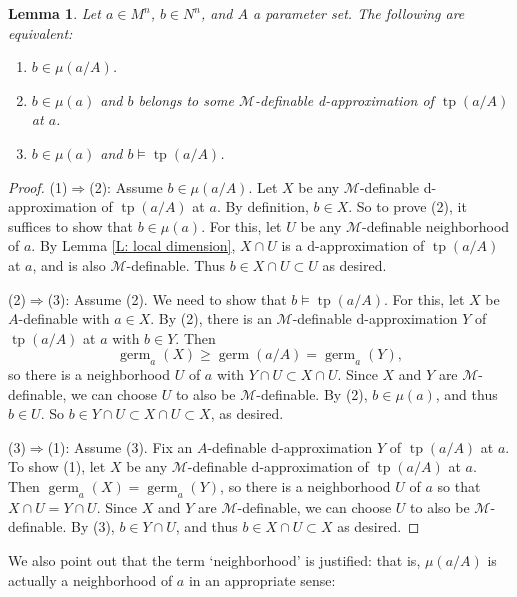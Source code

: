 \documentclass{amsart}
\newtheorem{lemma}[theorem]{Lemma}
\theoremstyle{definition}
\newcommand{\tp}{\operatorname{tp}}
\begin{document}
    \begin{lemma}\label{L: mu characterization}
        Let $a\in M^n$, $b\in N^n$, and $A$ a parameter set. The following are equivalent:
        \begin{enumerate}
            \item $b\in\mu(a/A)$.
            \item $b\in\mu(a)$ and $b$ belongs to some $\mathcal M$-definable d-approximation of $\tp(a/A)$ at $a$.
            \item $b\in\mu(a)$ and $b\models\tp(a/A)$.
            \end{enumerate}
    \end{lemma}
    \begin{proof}
        (1)$\Rightarrow$(2): Assume $b\in\mu(a/A)$. Let $X$ be any $\mathcal M$-definable d-approximation of $\tp(a/A)$ at $a$. By definition, $b\in X$. So to prove (2), it suffices to show that $b\in\mu(a)$. For this, let $U$ be any $\mathcal M$-definable neighborhood of $a$. By Lemma \ref{L: local dimension}, $X\cap U$ is a d-approximation of $\tp(a/A)$ at $a$, and is also $\mathcal M$-definable. Thus $b\in X\cap U\subset U$ as desired.

        (2)$\Rightarrow$(3): Assume (2). We need to show that $b\models\tp(a/A)$. For this, let $X$ be $A$-definable with $a\in X$. By (2), there is an $\mathcal M$-definable d-approximation $Y$ of $\tp(a/A)$ at $a$ with $b\in Y$. Then $$\operatorname{germ}_a(X)\geq\operatorname{germ}(a/A)=\operatorname{germ}_a(Y),$$ so there is a neighborhood $U$ of $a$ with $Y\cap U\subset X\cap U$. Since $X$ and $Y$ are $\mathcal M$-definable, we can choose $U$ to also be $\mathcal M$-definable. By (2), $b\in\mu(a)$, and thus $b\in U$. So $b\in Y\cap U\subset X\cap U\subset X$, as desired.

        (3)$\Rightarrow$(1): Assume (3). Fix an $A$-definable d-approximation $Y$ of $\tp(a/A)$ at $a$. To show (1), let $X$ be any $\mathcal M$-definable d-approximation of $\tp(a/A)$ at $a$. Then $\operatorname{germ}_a(X)=\operatorname{germ}_a(Y)$, so there is a neighborhood $U$ of $a$ so that $X\cap U=Y\cap U$. Since $X$ and $Y$ are $\mathcal M$-definable, we can choose $U$ to also be $\mathcal M$-definable. By (3), $b\in Y\cap U$, and thus $b\in X\cap U\subset X$ as desired.
    \end{proof}

    We also point out that the term `neighborhood' is justified: that is, $\mu(a/A)$ is actually a neighborhood of $a$ in an appropriate sense: 
\end{document}
